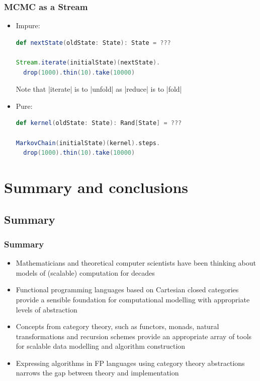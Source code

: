 \documentclass[mathserif,handout]{beamer}
\begin{document}
\begin{frame}[fragile]
\frametitle{MCMC as a Stream}
\begin{itemize}
\item Impure:
\begin{lstlisting}[language=scala]
def nextState(oldState: State): State = ???

Stream.iterate(initialState)(nextState).
  drop(1000).thin(10).take(10000)
\end{lstlisting}
Note that |iterate| is to |unfold| as |reduce| is to |fold|
\item Pure:
\begin{lstlisting}[language=scala]
def kernel(oldState: State): Rand[State] = ???

MarkovChain(initialState)(kernel).steps.
  drop(1000).thin(10).take(10000)
\end{lstlisting}  
\end{itemize}
\end{frame}


\section{Summary and conclusions}

\subsection{Summary}

\begin{frame}
  \frametitle{Summary}
  \begin{itemize}
  \item Mathematicians and theoretical computer scientists have been thinking about models of (scalable) computation for decades
  \item Functional programming languages based on Cartesian closed categories provide a sensible foundation for computational modelling with appropriate levels of abstraction
  \item Concepts from category theory, such as functors, monads, natural transformations and recursion schemes provide an appropriate array of tools for scalable data modelling and algorithm construction
    \item Expressing algorithms in FP languages using category theory abstractions narrows the gap between theory and implementation
  \end{itemize}
\end{frame}
\end{document}
